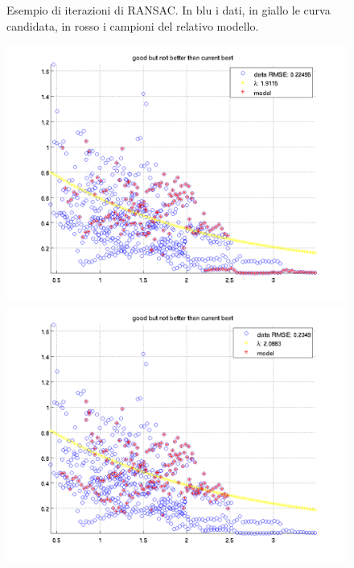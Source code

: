 \documentclass[12pt]{report}
\begin{document}
\begin{figure}[H]
\begin{minipage}[t]{0.5\linewidth}
\end{minipage}
\caption[short]{Esempio di iterazioni di RANSAC. In blu i dati, in giallo le curva candidata, in rosso i campioni del relativo modello.}
\label{fig:ransac1}
\end{figure}

\begin{figure}[H]
\begin{minipage}[t]{0.5\linewidth}
	\centering
	\includegraphics[scale=\imFeatRan]{images/ransac7}\\
	\includegraphics[scale=\imFeatRan]{images/ransac9}\\

\end{minipage}
\end{figure}
\end{document}
